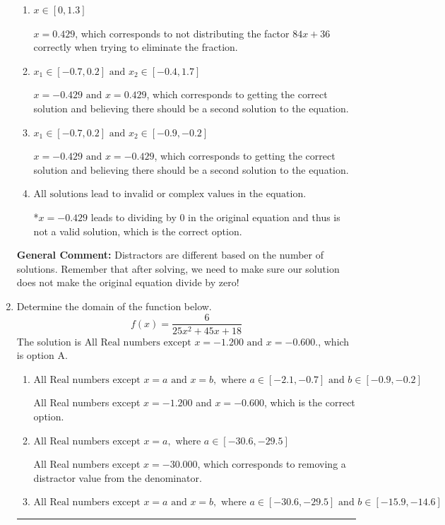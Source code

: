 \documentclass{extbook}[14pt]
\newcommand{\litem}[1]{\item #1

\rule{\textwidth}{0.4pt}}
\begin{document}
\begin{enumerate}
{\begin{enumerate}[label=\Alph*.]
$x = -0.429$, which corresponds to not checking if this value leads to dividing by 0 in the original equation and thus is not a valid solution.
\item \( x \in [0,1.3] \)

$x = 0.429$, which corresponds to not distributing the factor $84x + 36$ correctly when trying to eliminate the fraction.
\item \( x_1 \in [-0.7, 0.2] \text{ and } x_2 \in [-0.4,1.7] \)

$x = -0.429 \text{ and } x = 0.429$, which corresponds to getting the correct solution and believing there should be a second solution to the equation.
\item \( x_1 \in [-0.7, 0.2] \text{ and } x_2 \in [-0.9,-0.2] \)

$x = -0.429 \text{ and } x = -0.429$, which corresponds to getting the correct solution and believing there should be a second solution to the equation.
\item \( \text{All solutions lead to invalid or complex values in the equation.} \)

*$x = -0.429$ leads to dividing by 0 in the original equation and thus is not a valid solution, which is the correct option.
\end{enumerate}

\textbf{General Comment:} Distractors are different based on the number of solutions. Remember that after solving, we need to make sure our solution does not make the original equation divide by zero!
}
\litem{
Determine the domain of the function below.
\[ f(x) = \frac{6}{25x^{2} +45 x + 18} \]The solution is \( \text{All Real numbers except } x = -1.200 \text{ and } x = -0.600. \), which is option A.\begin{enumerate}[label=\Alph*.]
\item \( \text{All Real numbers except } x = a \text{ and } x = b, \text{ where } a \in [-2.1, -0.7] \text{ and } b \in [-0.9, -0.2] \)

All Real numbers except $x = -1.200$ and $x = -0.600$, which is the correct option.
\item \( \text{All Real numbers except } x = a, \text{ where } a \in [-30.6, -29.5] \)

All Real numbers except $x = -30.000$, which corresponds to removing a distractor value from the denominator.
\item \( \text{All Real numbers except } x = a \text{ and } x = b, \text{ where } a \in [-30.6, -29.5] \text{ and } b \in [-15.9, -14.6] \)


\end{enumerate}}
\end{enumerate}
\end{document}
